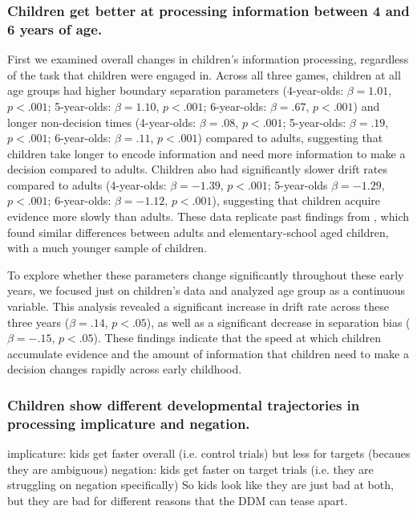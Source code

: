 \documentclass[10pt,letterpaper]{article}
\begin{document}
\subsubsection{Children get better at processing information between 4 and 6 years of age.}

First we examined overall changes in children's information processing, regardless of the task that children were engaged in. Across all three games, children at all age groups had higher boundary separation parameters (4-year-olds: $\beta = 1.01$, $p <.001$; 5-year-olds: $\beta = 1.10$, $p <.001$; 6-year-olds: $\beta = .67$, $p <.001$) and longer non-decision times (4-year-olds: $\beta = .08$, $p <.001$; 5-year-olds: $\beta = .19$, $p <.001$; 6-year-olds: $\beta = .11$, $p <.001$) compared to adults, suggesting that children take longer to encode information and need more information to make a decision compared to adults.  Children also had significantly slower drift rates compared to adults (4-year-olds: $\beta = -1.39$, $p <.001$; 5-year-olds $\beta = -1.29$, $p <.001$; 6-year-olds: $\beta = -1.12$, $p <.001$), suggesting that children acquire evidence more slowly than adults.  These data replicate past findings from , which found similar differences between adults and elementary-school aged children, with a much younger sample of children.  

To explore whether these parameters change significantly throughout these early years, we focused just on children's data and analyzed age group as a continuous variable.  This analysis revealed a significant increase in drift rate across these three years ($\beta = .14$, $p < .05$), as well as a significant decrease in separation bias ($\beta = -.15$, $p < .05$).  These findings indicate that the speed at which children accumulate evidence and the amount of information that children need to make a decision changes rapidly across early childhood.  

\subsubsection{Children show different developmental trajectories in processing implicature and negation.}

implicature: kids get faster overall (i.e. control trials) but less for targets (becaues they are ambiguous)
	negation: kids get faster on target trials (i.e. they are struggling on negation specifically)
	So kids look like they are just bad at both, but they are bad for different reasons that the DDM can tease 	apart.
\end{document}
